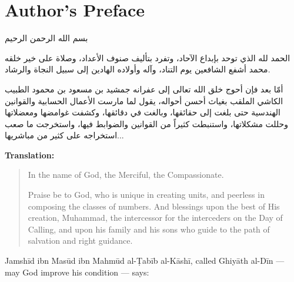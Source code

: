 \documentclass[11pt,a4paper]{article}
\newenvironment{arabicbox}{%
  \begin{framed}
  \begin{minipage}{\linewidth-2\fboxsep-2\fboxrule}
  \setlength{\parindent}{0pt}
  \linespread{1.3}\selectfont
}{%
  \end{minipage}
  \end{framed}
}
\begin{document}
\section*{Author's Preface}

\begin{arabicbox}
\begin{Arabic}
بسم الله الرحمن الرحيم

الحمد لله الذي توحد بإبداع الآحاد، وتفرد بتأليف صنوف الأعداد، وصلاة على خير خلقه محمد أشفع الشافعين يوم التناد، وآله وأولاده الهادين إلى سبيل النجاة والرشاد.

أمّا بعد فإن أحوج خلق الله تعالى إلى عفرانه جمشيد بن مسعود بن محمود الطبيب الكاشي الملقب بغياث أحسن أحواله، يقول لما مارست الأعمال الحسابية والقوانين الهندسية حتى بلغت إلى حقائقها، وبالغت في دقائقها، وكشفت غوامضها ومعضلاتها وحللت مشكلاتها، واستنبطت كثيراً من القوانين والضوابط فيها، واستخرجت ما صعب استخراجه على كثير من مباشريها...
\end{Arabic}
\end{arabicbox}

\vspace{0.5cm}
\noindent\textbf{Translation:}

\begin{quote}
In the name of God, the Merciful, the Compassionate.

Praise be to God, who is unique in creating units, and peerless in
composing the classes of numbers. And blessings upon the best of His
creation, Muhammad, the intercessor for the interceders on the Day of
Calling, and upon his family and his sons who guide to the path of
salvation and right guidance.
\end{quote}

\vspace{0.3cm}
\noindent Jamsh\=id ibn Mas\=ud ibn Mahm\=ud al-\d{T}ab\=ib al-K\=ash\=i, called
Ghiy\=ath al-D\=in --- may God improve his condition --- says:
\end{document}
